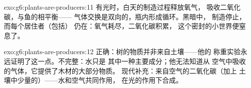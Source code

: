 \begin{solution}{exo:g6:plants-are-producers:11}
有光时，白天的制造过程释放氧气，
吸收二氧化碳，与鱼的相平衡——
气体交换是双向的，瓶内形成循环。黑暗中，
制造停止，而每个居住者（包括）
仍在：氧气耗尽，二氧化碳积累，
这个密封的小世界便窒息了。
\end{solution}

\begin{solution}{exo:g6:plants-are-producers:12}
正确：树的物质并非来自土壤——他的
称重实验永远证明了这一点。不完整：水只是
其中一种主要成分；他无法知道从
空气中吸收的气体，它提供了木材的大部分物质。
现代补充：来自空气的二氧化碳（加上
土壤中少量的）——水和空气共同作用，
在光的作用下合成。
\end{solution}

